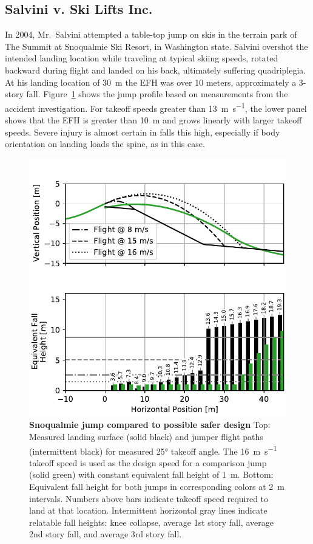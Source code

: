\documentclass[smallextended]{svjour3}       %
\begin{document}
\subsection{Salvini v. Ski Lifts Inc.}
\label{sec:salvini}
%
In 2004, Mr.~Salvini attempted a table-top jump on skis in the terrain park of
The Summit at Snoqualmie Ski Resort, in Washington state. Salvini overshot the
intended landing location while traveling at typical skiing speeds, rotated
backward during flight and landed on his back, ultimately suffering
quadriplegia. At his landing location of 30~\si{\meter} the EFH was over 10
meters, approximately a 3-story fall.  Figure~\ref{fig:salvini-v-snoqualmie}
shows the jump profile based on measurements from the accident investigation.
For takeoff speeds greater than 13~\si{\meter\per\second}, the lower panel
shows that the EFH is greater than 10~\si{\meter} and grows linearly with
larger takeoff speeds. Severe injury is almost certain in falls this high,
especially if body orientation on landing loads the spine, as in this case.
%
\begin{figure}
  \centering
  \includegraphics[width=\columnwidth]{figures/salvini-v-snoqualmie.pdf}
  \caption{\textbf{Snoqualmie jump compared to possible safer design}
  Top: Measured landing surface (solid black) and jumper flight paths
  (intermittent black) for measured 25\si{\degree} takeoff angle. The
  16~\si{\meter\per\second} takeoff speed is used as the design speed for a
  comparison jump (solid green) with constant equivalent fall height of
  1~\si{\meter}.
  Bottom: Equivalent fall height for both jumps in corresponding colors
  at 2~\si{\meter} intervals. Numbers above bars indicate takeoff speed
  required to land at that location.
  Intermittent horizontal gray lines indicate relatable fall heights: knee
  collapse, average 1st story fall, average 2nd story fall, and average 3rd
  story fall.
  }
  \label{fig:salvini-v-snoqualmie}
\end{figure}
\end{document}
